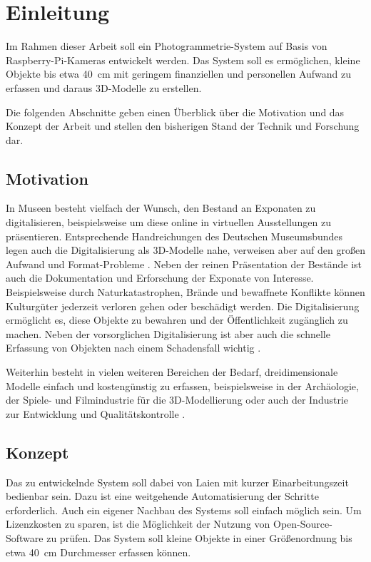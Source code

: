 \documentclass[./00PhotoBox]{subfiles}
\begin{document}
\chapter{Einleitung}
\label{c:einleitung}

Im Rahmen dieser Arbeit soll ein Photogrammetrie-System auf Basis von Raspberry-Pi-Kameras entwickelt werden. Das System soll es ermöglichen, kleine Objekte bis etwa \SI{40}{\centi\metre} mit geringem finanziellen und personellen Aufwand zu erfassen und daraus 3D-Modelle zu erstellen.

Die folgenden Abschnitte geben einen Überblick über die Motivation und das Konzept der Arbeit und stellen den bisherigen Stand der Technik und Forschung dar.

\section{Motivation}

In Museen besteht vielfach der Wunsch, den Bestand an Exponaten zu digitalisieren, beispielsweise um diese online in virtuellen Ausstellungen zu präsentieren. Entsprechende Handreichungen des Deutschen Museumsbundes legen auch die Digitalisierung als 3D-Modelle nahe, verweisen aber auf den großen Aufwand und Format-Probleme \citep[vgl.][S. 43]{handreichung_digital}. Neben der reinen Präsentation der Bestände ist auch die Dokumentation und Erforschung der Exponate von Interesse. Beispielsweise durch Naturkatastrophen, Brände und bewaffnete Konflikte können Kulturgüter jederzeit verloren gehen oder beschädigt werden. Die Digitalisierung ermöglicht es, diese Objekte zu bewahren und der Öffentlichkeit zugänglich zu machen. Neben der vorsorglichen Digitalisierung ist aber auch die schnelle Erfassung von Objekten nach einem Schadensfall wichtig \citep[vgl.][]{kulturgutretter}.

Weiterhin besteht in vielen weiteren Bereichen der Bedarf, dreidimensionale Modelle einfach und kostengünstig zu erfassen, beispielsweise in der Archäologie, der Spiele- und Filmindustrie für die 3D-Modellierung oder auch der Industrie zur Entwicklung und Qualitätskontrolle \citep[vgl.][S. 37f]{luhmann}.

\section{Konzept}
Das zu entwickelnde System soll dabei von Laien mit kurzer Einarbeitungszeit bedienbar sein. Dazu ist eine weitgehende Automatisierung der Schritte erforderlich. Auch ein eigener Nachbau des Systems soll einfach möglich sein. Um Lizenzkosten zu sparen, ist die Möglich\-keit der Nutzung von Open-Source-Software zu prüfen. Das System soll kleine Objekte in einer Größenordnung bis etwa \SI{40}{\centi\metre} Durchmesser erfassen können.
\end{document}
